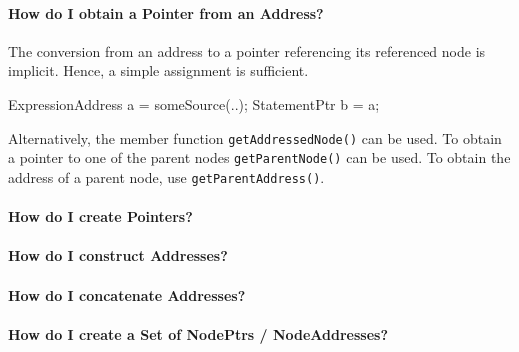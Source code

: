 \paragraph{How do I obtain a Pointer from an Address?}
The conversion from an address to a pointer referencing its referenced node is
implicit. Hence, a simple assignment is sufficient.
\begin{insCode}
	ExpressionAddress a = someSource(..);
	StatementPtr b = a;
\end{insCode}
Alternatively, the member function \lstinline|getAddressedNode()| can be used.
To obtain a pointer to one of the parent nodes \lstinline|getParentNode()| can
be used. To obtain the address of a parent node, use
\lstinline|getParentAddress()|.

\paragraph{How do I create Pointers?}

\paragraph{How do I construct Addresses?}

\paragraph{How do I concatenate Addresses?}

\paragraph{How do I create a Set of NodePtrs / NodeAddresses?}



